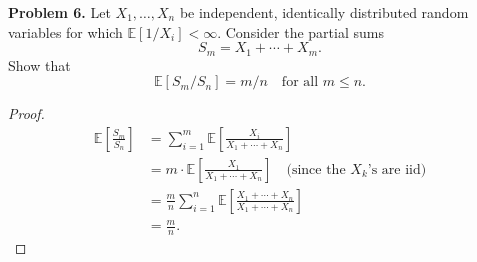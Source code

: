 \documentclass[11pt,letterpaper]{report}
\newcommand{\E}{\mathbb{E}}
\begin{document}
\noindent\textbf{Problem 6. }
Let $X_1, \ldots, X_n$ be independent, identically distributed random variables for which $\E[1/X_i]<\infty$. Consider the partial sums
\[
S_m = X_1 + \cdots + X_m.
\]
Show that
\[
\E[S_m/S_n] = m/n\quad\text{for all }m\leq n.
\]
\begin{proof}
	\begin{align*}
		\E\left[\frac{S_m}{S_n}\right] &= \sum_{i=1}^m\E\left[\frac{X_i}{X_1 + \cdots + X_n}\right]\\
		&= m\cdot \E\left[\frac{X_1}{X_1 + \cdots + X_n}\right]\quad\text{(since the $X_k$'s  are iid)}\\
		&= \frac{m}{n}\sum_{i=1}^n\E\left[\frac{X_1 + \cdots + X_n}{X_1 + \cdots + X_n}\right]\\
		&= \frac{m}{n}.
	\end{align*}
\end{proof}
\end{document}
